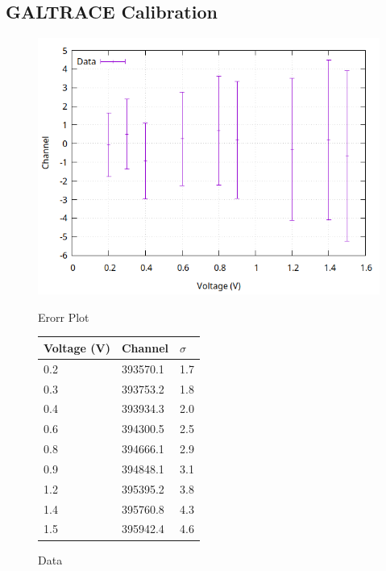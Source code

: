 \subsection{GALTRACE Calibration}

\begin{figure}[h]
  \centering
  \begin{minipage}[b]{0.45\textwidth}
    \includegraphics[width=\textwidth]{img/first_board_line/data_2/calib_1.png}
    \caption{Erorr Plot}
    \label{calib:plot:1}
  \end{minipage}
  \hfill
  \begin{minipage}[b]{0.45\textwidth}
  \begin{tabular}{lll}
    Voltage (V) & Channel & $\sigma$ \\
    \midrule
    0.2 & \num{393570.1} & 1.7 \\
    0.3 & \num{393753.2} & 1.8 \\
    0.4 & \num{393934.3} & 2.0 \\
    0.6 & \num{394300.5} & 2.5 \\
    0.8 & \num{394666.1} & 2.9 \\
    0.9 & \num{394848.1} & 3.1 \\
    1.2 & \num{395395.2} & 3.8 \\
    1.4 & \num{395760.8} & 4.3 \\
    1.5 & \num{395942.4} & 4.6 \\
    \bottomrule
  \end{tabular}
  \caption{Data}
  \label{calib:1}
  \end{minipage}
\end{figure}

